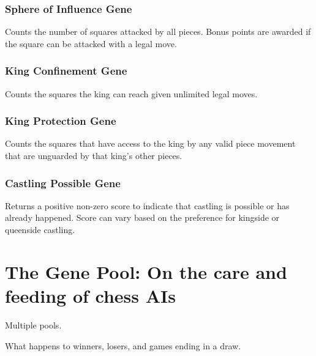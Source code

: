 \documentclass[letter]{article}
\renewcommand\_{\textunderscore\allowbreak}
\begin{document}
\subsubsection{Sphere of Influence Gene}
Counts the number of squares attacked by all pieces. Bonus points are awarded if the square can be attacked with a legal move.

\subsubsection{King Confinement Gene}
Counts the squares the king can reach given unlimited legal moves.

\subsubsection{King Protection Gene}
Counts the squares that have access to the king by any valid piece movement that are unguarded by that king's other pieces.

\subsubsection{Castling Possible Gene}
Returns a positive non-zero score to indicate that castling is possible or has already happened. Score can vary based on the preference for kingside or queenside castling.




\section{The Gene Pool: On the care and feeding of chess AIs}

Multiple pools.

What happens to winners, losers, and games ending in a draw.
\end{document}
